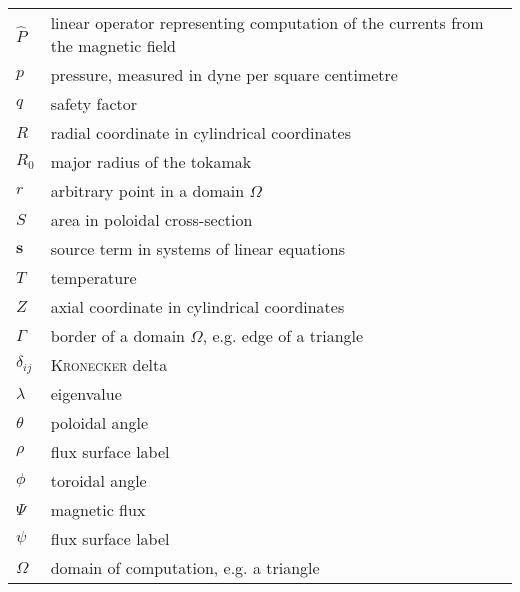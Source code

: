 \documentclass[a4paper, twoside, 10pt, english]{article}
\numberwithin{equation}{section}
\let\temp\varrho
\let\varrho\rho
\let\rho\temp
\let\temp\vartheta
\let\vartheta\theta
\let\theta\temp
\let\temp\varphi
\let\varphi\phi
\let\phi\temp
\let\vec\symbf
\begin{document}
\begin{longtable}{l >{\RaggedRight}p{}}
  $\hat{P}$ & linear operator representing computation of the currents from the magnetic field \\
  $p$ & pressure, measured in dyne per square centimetre \\
  $q$ & safety factor \\
  $R$ & radial coordinate in cylindrical coordinates \\
  $R_{0}$ & major radius of the tokamak \\
  $r$ & arbitrary point in a domain $\Omega$ \\
  $S$ & area in poloidal cross-section \\
  $\vec{s}$ & source term in systems of linear equations \\
  $T$ & temperature \\
  $Z$ & axial coordinate in cylindrical coordinates \\
  $\Gamma$ & border of a domain $\Omega$, e.g. edge of a triangle \\
  $\delta_{ij}$ & \textsc{Kronecker} delta \\
  $\lambda$ & eigenvalue \\
  $\theta$ & poloidal angle \\
  $\rho$ & flux surface label \\
  $\phi$ & toroidal angle \\
  $\Psi$ & magnetic flux \\
  $\psi$ & flux surface label \\
  $\Omega$ & domain of computation, e.g. a triangle \\
  \bottomrule
\end{longtable}
\end{document}

